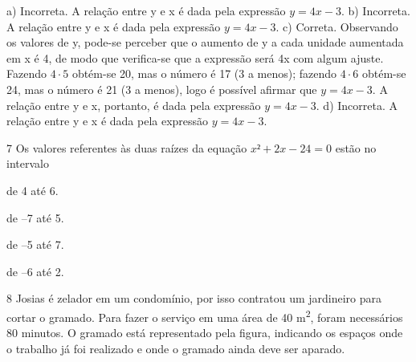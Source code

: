 {{{\begin{escolha}
{{{{\begin{escolha}
\begin{escolha}
{\begin{escolha}
\begin{escolha}
\begin{escolha}
\begin{escolha}
\begin{escolha}
\begin{escolha}
{a) Incorreta. A relação entre y e x é dada pela expressão $y = 4x - 3$.
b) Incorreta. A relação entre y e x é dada pela expressão $y = 4x - 3$.
c) Correta. Observando os valores de y, pode-se perceber que o aumento 
de y a cada unidade aumentada em x é 4, de modo que verifica-se que a
expressão será 4x com algum ajuste. Fazendo $4 \cdot 5$ obtém-se 20, mas o 
número é 17 (3 a menos); fazendo $4 \cdot 6$ obtém-se 24, mas o número é 21
(3 a menos), logo é possível afirmar que $y = 4x - 3$. A relação entre y e
x, portanto, é dada pela expressão $y = 4x - 3$.
d) Incorreta. A relação entre y e x é dada pela expressão $y = 4x - 3$.}

\num{7} Os valores referentes às duas raízes da equação $x² + 2x - 24
= 0$ estão no intervalo

\begin{escolha}

  \item de 4 até 6. 

  \item de --7 até 5. 

  \item de --5 até 7. 

  \item de --6 até 2.

\end{escolha}


\num{8} Josias é zelador em um condomínio, por isso contratou um jardineiro
para cortar o gramado. Para fazer o serviço em uma área de 
40 m\textsuperscript{2}, foram necessários 80 minutos. O gramado está
representado pela figura, indicando os espaços onde o trabalho já foi
realizado e onde o gramado ainda deve ser aparado.


\end{escolha}
\end{escolha}
\end{escolha}
\end{escolha}
\end{escolha}
\end{escolha}}
\end{escolha}
\end{escolha}}}}}
\end{escolha}}}}
